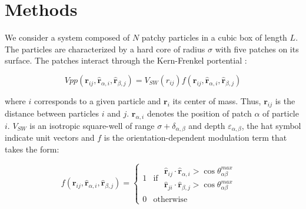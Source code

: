 \documentclass[a4paper, amsfonts, amssymb, amsmath, reprint, showkeys, nofootinbib, twoside]{revtex4-1}
\begin{document}




\section{Methods}

We consider a system composed of $N$ patchy particles in a cubic box of length $L$. The particles are characterized by a hard core of radius $\sigma$ with five patches on its surface. The patches interact through the Kern-Frenkel portential \cite{Kern2003}:

\begin{equation}
Vpp(\boldsymbol{r}_{ij}, \boldsymbol{\hat{r}}_{\alpha, i}, \boldsymbol{\hat{r}}_{\beta, j})=V_{SW}(r_{ij})f(\boldsymbol{r}_{ij}, \boldsymbol{\hat{r}}_{\alpha, i}, \boldsymbol{\hat{r}}_{\beta, j})
\end{equation}

where $i$ corresponds to a given particle and $\boldsymbol{r}_{i}$ its center of mass. Thus, $\boldsymbol{r}_{ij}$ is the distance between particles $i$ and $j$. $\boldsymbol{r}_{\alpha, i}$ denotes the position of patch $\alpha$ of particle $i$. $V_{SW}$ is an isotropic square-well of range $\sigma + \delta_{\alpha,\beta}$ and depth $\varepsilon_{\alpha,\beta}$, the hat symbol indicate unit vectors and $f$ is the orientation-dependent modulation term that takes the form:

\begin{equation}
\label{KF}
f(\boldsymbol{r}_{ij}, \boldsymbol{\hat{r}}_{\alpha, i}, \boldsymbol{\hat{r}}_{\beta, j})=
    \begin{cases}
        1 & \text{if $\begin{aligned}
            \text{$\boldsymbol{\hat{r}}_{ij} \cdot \boldsymbol{\hat{r}}_{\alpha, i} > \cos     \theta^{max}_{\alpha \beta}$} \\
            \text{$\boldsymbol{\hat{r}}_{ji} \cdot \boldsymbol{\hat{r}}_{\beta, j} > \cos     \theta^{max}_{\alpha \beta}$}
        \end{aligned}$ } \\
        0 & \text{otherwise}
    \end{cases}
\end{equation}
\end{document}
